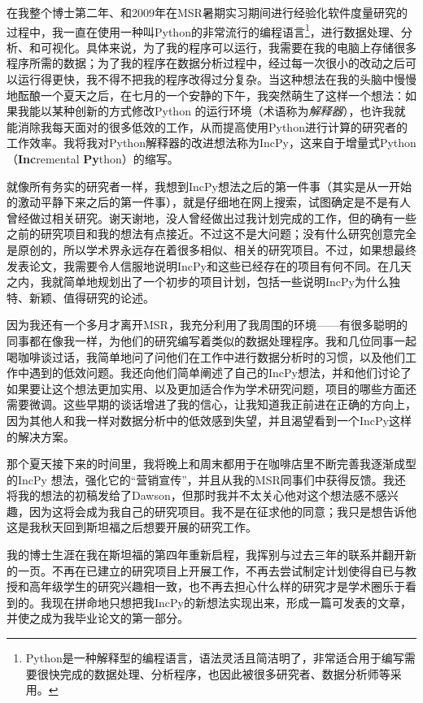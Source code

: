\documentclass[letter,12pt]{book}
\begin{document}
\begin{CJK}{UTF8}{gbsn}
在我整个博士第二年、和2009年在MSR暑期实习期间进行经验化软件度量研究的过程中，我一直在使用一种叫Python的非常流行的编程语言\footnote{Python是一种解释型的编程语言，语法灵活且简洁明了，非常适合用于编写需要很快完成的数据处理、分析程序，也因此被很多研究者、数据分析师等采用。}，进行数据处理、分析、和可视化。具体来说，为了我的程序可以运行，我需要在我的电脑上存储很多程序所需的数据；为了我的程序在数据分析过程中，经过每一次很小的改动之后可以运行得更快，我不得不把我的程序改得过分复杂。当这种想法在我的头脑中慢慢地酝酿一个夏天之后，在七月的一个安静的下午，我突然萌生了这样一个想法：如果我能以某种创新的方式修改Python 的运行环境（术语称为\emph{解释器}），也许我就能消除我每天面对的很多低效的工作，从而提高使用Python进行计算的研究者的工作效率。我将我对Python解释器的改进想法称为IncPy，这来自于增量式Python （\textbf{Inc}remental \textbf{Py}thon）的缩写。

\breakline

就像所有务实的研究者一样，我想到IncPy想法之后的第一件事（其实是从一开始的激动平静下来之后的第一件事），就是仔细地在网上搜索，试图确定是不是有人曾经做过相关研究。谢天谢地，没人曾经做出过我计划完成的工作，但的确有一些之前的研究项目和我的想法有点接近。不过这不是大问题；没有什么研究创意完全是原创的，所以学术界永远存在着很多相似、相关的研究项目。不过，如果想最终发表论文，我需要令人信服地说明IncPy和这些已经存在的项目有何不同。在几天之内，我就简单地规划出了一个初步的项目计划，包括一些说明IncPy为什么独特、新颖、值得研究的论述。

因为我还有一个多月才离开MSR，我充分利用了我周围的环境——有很多聪明的同事都在像我一样，为他们的研究编写着类似的数据处理程序。我和几位同事一起喝咖啡谈过话，我简单地问了问他们在工作中进行数据分析时的习惯，以及他们工作中遇到的低效问题。我还向他们简单阐述了自己的IncPy想法，并和他们讨论了如果要让这个想法更加实用、以及更加适合作为学术研究问题，项目的哪些方面还需要微调。这些早期的谈话增进了我的信心，让我知道我正前进在正确的方向上，因为其他人和我一样对数据分析中的低效感到失望，并且渴望看到一个IncPy这样的解决方案。

那个夏天接下来的时间里，我将晚上和周末都用于在咖啡店里不断完善我逐渐成型的IncPy 想法，强化它的“营销宣传”，并且从我的MSR同事们中获得反馈。我还将我的想法的初稿发给了Dawson，但那时我并不太关心他对这个想法感不感兴趣，因为这将会成为我自己的研究项目。我不是在征求他的同意；我只是想告诉他这是我秋天回到斯坦福之后想要开展的研究工作。

\breakline

我的博士生涯在我在斯坦福的第四年重新启程，我挥别与过去三年的联系并翻开新的一页。不再在已建立的研究项目上开展工作，不再去尝试制定计划使得自已与教授和高年级学生的研究兴趣相一致，也不再去担心什么样的研究才是学术圈乐于看到的。我现在拼命地只想把我IncPy的新想法实现出来，形成一篇可发表的文章，并使之成为我毕业论文的第一部分。


\end{CJK}
\end{document}
